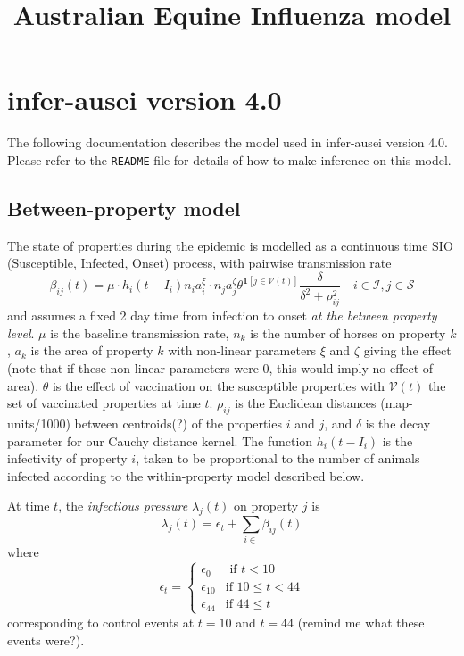 \documentclass[english]{article}
\begin{document}
\title{Australian Equine Influenza model}

\maketitle

\section{infer-ausei version 4.0}

The following documentation describes the model used in infer-ausei
version 4.0. Please refer to the \texttt{README} file for details
of how to make inference on this model.


\subsection{Between-property model}

The state of properties during the epidemic is modelled as a continuous
time SIO (Susceptible, Infected, Onset) process, with pairwise transmission
rate
\[
\beta_{ij}(t)=\mu\cdot h_{i}(t-I_{i})n_{i}a_{i}^{\xi}\cdot n_{j}a_{j}^{\zeta}\theta^{\bm{1}[j\in\mathcal{V}(t)]}\frac{\delta}{\delta^{2}+\rho_{ij}^{2}}\hspace{1em}i\in\mathcal{I},j\in\mathcal{S}
\]
and assumes a fixed 2 day time from infection to onset \emph{at the
between property level}. $\mu$ is the baseline transmission rate,
$n_{k}$ is the number of horses on property $k$, $a_{k}$ is the
area of property $k$ with non-linear parameters $\xi$ and $\zeta$
giving the effect (note that if these non-linear parameters were 0,
this would imply no effect of area). $\theta$ is the effect of vaccination
on the susceptible properties with $\mathcal{V}(t)$ the set of vaccinated
properties at time $t$. $\rho_{ij}$ is the Euclidean distances (map-units/1000)
between centroids(?) of the properties $i$ and $j$, and $\delta$
is the decay parameter for our Cauchy distance kernel. The function
$h_{i}(t-I_{i})$ is the infectivity of property $i$, taken to be
proportional to the number of animals infected according to the within-property
model described below.

At time $t$, the \emph{infectious pressure} $\lambda_{j}(t)$ on
property $j$ is
\[
\lambda_{j}(t)=\epsilon_{t}+\sum_{i\in}\beta_{ij}(t)
\]
where
\[
\epsilon_{t}=\begin{cases}
\epsilon_{0} & \mbox{ if }t<10\\
\epsilon_{10} & \mbox{if }10\leq t<44\\
\epsilon_{44} & \mbox{if }44\leq t
\end{cases}
\]
corresponding to control events at $t=10$ and $t=44$ (remind me
what these events were?).
\end{document}
